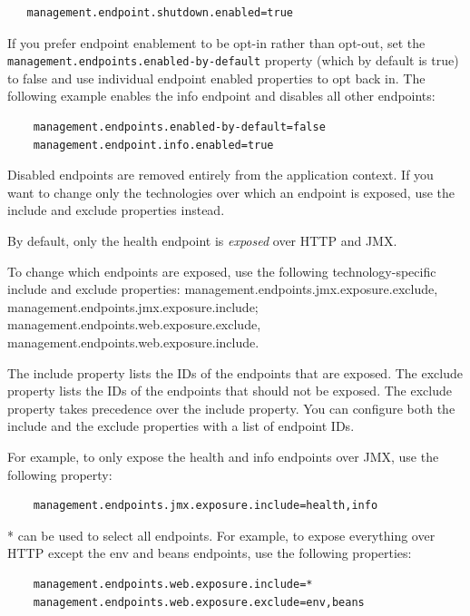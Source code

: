 \documentclass{scrartcl}
\begin{document}
\begin{lstlisting}
   management.endpoint.shutdown.enabled=true
\end{lstlisting}

If you prefer endpoint enablement to be opt-in rather than opt-out, set the \lstinline|management.endpoints.enabled-by-default| property (which by default is true) to false and use individual endpoint enabled properties to opt back in. The following example enables the info endpoint and disables all other endpoints:

\begin{lstlisting}
    management.endpoints.enabled-by-default=false
    management.endpoint.info.enabled=true
\end{lstlisting}

Disabled endpoints are removed entirely from the application context. If you want to change only the technologies over which an endpoint is exposed, use the include and exclude properties instead.

By default, only the health endpoint is \textit{exposed} over HTTP and JMX.

To change which endpoints are exposed, use the following technology-specific include and exclude properties: management.endpoints.jmx.exposure.exclude,
management.endpoints.jmx.exposure.include; management.endpoints.web.exposure.exclude, management.endpoints.web.exposure.include.

The include property lists the IDs of the endpoints that are exposed. The exclude property lists the IDs of the endpoints that should not be exposed. The exclude property takes precedence over the include property. You can configure both the include and the exclude properties with a list of endpoint IDs.

For example, to only expose the health and info endpoints over JMX, use the following property:

\begin{lstlisting}
    management.endpoints.jmx.exposure.include=health,info
\end{lstlisting}

* can be used to select all endpoints. For example, to expose everything over HTTP except the env and beans endpoints, use the following properties:

\begin{lstlisting}
    management.endpoints.web.exposure.include=*
    management.endpoints.web.exposure.exclude=env,beans

\end{lstlisting}
\end{document}
